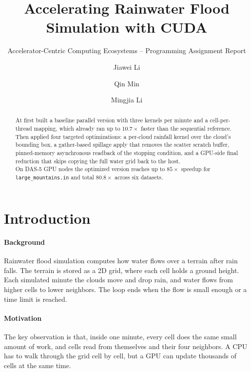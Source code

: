 \documentclass[sigconf, nonacm, review]{acmart}
\begin{document}
\title{Accelerating Rainwater Flood Simulation with CUDA}
\subtitle{Accelerator-Centric Computing Ecosystems -- Programming Assignment Report}

\author{Jiawei Li}

\author{Qin Min}
\author{Mingjia Li}

\begin{abstract}
  At first built a baseline parallel version with three kernels per
  minute and a cell-per-thread mapping, which already ran up to
  $10.7\times$ faster than the sequential reference. \\
  Then applied
  four targeted optimizations: a per-cloud rainfall kernel over the
  cloud's bounding box, a gather-based spillage apply that removes
  the scatter scratch buffer, pinned-memory asynchronous readback of
  the stopping condition, and a GPU-side final reduction that skips
  copying the full water grid back to the host.\\
  On DAS-5 GPU nodes
  the optimized version reaches up to $85\times$ speedup for
  \texttt{large\_mountains.in} and total $80.8\times$ across
  six datasets.
\end{abstract}

\maketitle

\section{Introduction}
\paragraph{Background}Rainwater flood simulation computes how water flows over a terrain
after rain falls. The terrain is stored as a 2D grid, where each
cell holds a ground height. Each simulated minute the clouds move
and drop rain, and water flows from higher cells to lower
neighbors. The loop ends when the flow is small enough or a time
limit is reached.

\paragraph{Motivation}The key observation is that, inside one minute, every cell does
the same small amount of work, and cells read from themselves
and their four neighbors. A CPU has to walk through the
grid cell by cell, but a GPU can update thousands of cells at the
same time.
\end{document}
